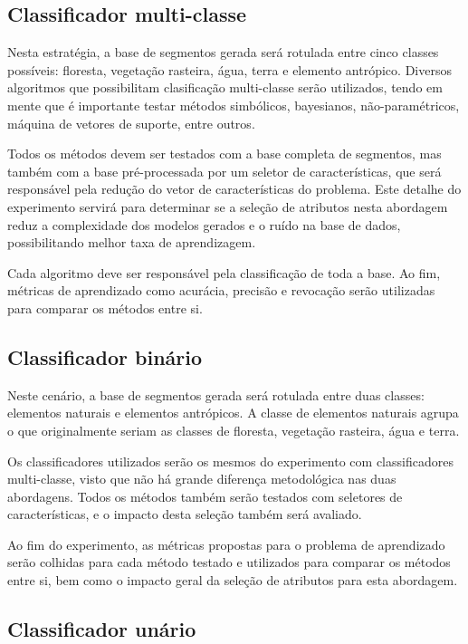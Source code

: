 \subsection{Classificador multi-classe}

Nesta estratégia, a base de segmentos gerada será rotulada entre cinco classes possíveis: floresta, vegetação rasteira, água, terra e elemento antrópico. Diversos algoritmos que possibilitam clasificação multi-classe serão utilizados, tendo em mente que é importante testar métodos simbólicos, bayesianos, não-paramétricos, máquina de vetores de suporte, entre outros.

Todos os métodos devem ser testados com a base completa de segmentos, mas também com a base pré-processada por um seletor de características, que será responsável pela redução do vetor de características do problema. Este detalhe do experimento servirá para determinar se a seleção de atributos nesta abordagem reduz a complexidade dos modelos gerados e o ruído na base de dados, possibilitando melhor taxa de aprendizagem.

Cada algoritmo deve ser responsável pela classificação de toda a base. Ao fim, métricas de aprendizado como acurácia, precisão e revocação serão utilizadas para comparar os métodos entre si.

\subsection{Classificador binário}

Neste cenário, a base de segmentos gerada será rotulada entre duas classes: elementos naturais e elementos antrópicos. A classe de elementos naturais agrupa o que originalmente seriam as classes de floresta, vegetação rasteira, água e terra.

Os classificadores utilizados serão os mesmos do experimento com classificadores multi-classe, visto que não há grande diferença metodológica nas duas abordagens. Todos os métodos também serão testados com seletores de características, e o impacto desta seleção também será avaliado.

Ao fim do experimento, as métricas propostas para o problema de aprendizado serão colhidas para cada método testado e utilizados para comparar os métodos entre si, bem como o impacto geral da seleção de atributos para esta abordagem.

\subsection{Classificador unário}

